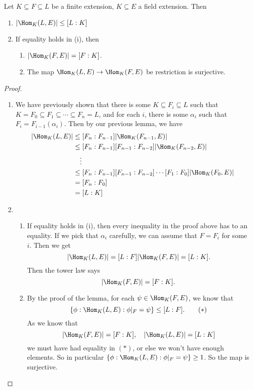 \documentclass[a4paper]{article}
\begin{document}
\begin{thm}[]
  Let $K\subseteq F\subseteq L$ be a finite extension, $K\subseteq E$ a field extension. Then
  \begin{enumerate}
    \item $|\Hom_K(L, E)| \leq [L:K]$
    \item If equality holds in (i), then
      \begin{enumerate}
        \item $|\Hom_K(F, E)| = [F:K]$.
        \item The map $\Hom_K(L, E) \to \Hom_K(F, E)$ be restriction is surjective.
      \end{enumerate}
  \end{enumerate}
\end{thm}

\begin{proof}\leavevmode
  \begin{enumerate}
    \item We have previously shown that there is some $K\subseteq F_i \subseteq L$ such that $K = F_0 \subseteq F_1 \subseteq\cdots \subseteq F_n = L$, and for each $i$, there is some $\alpha_i$ such that $F_i = F_{i - 1}(\alpha_i)$. Then by our previous lemma, we have
      \begin{align*}
        |\Hom_K(L, E)| &\leq [F_n:F_{n - 1}] |\Hom_K(F_{n - 1}, E)|\\
        &\leq [F_n: F_{n - 1}][F_{n - 1}: F_{n - 2}] |\Hom_K(F_{n - 2}, E)|\\
        &\quad \vdots\\
        &\leq [F_n:F_{n - 1}][F_{n - 1}:F_{n - 2}] \cdots [F_1:F_0] |\Hom_K(F_0, E)|\\
        &= [F_n:F_0]\\
        &= [L:K]
      \end{align*}
    \item
    \begin{enumerate}
      \item If equality holds in (i), then every inequality in the proof above has to an equality. If we pick that $\alpha_i$ carefully, we can assume that $F = F_i$ for some $i$. Then we get
        \[
          |\Hom_K(L, E)| = [L:F] |\Hom_K(F, E)| = [L:K].
        \]
        Then the tower law says
        \[
          |\Hom_K(F, E)| = [F:K].
        \]
      \item By the proof of the lemma, for each $\psi \in \Hom_K(F, E)$, we know that
        \[
          \{\phi: \Hom_K(L, E): \phi|_F = \psi\} \leq [L:F].\tag{$*$}
        \]
        As we know that
        \[
          |\Hom_K(F, E)| = [F:K],\quad |\Hom_K(L, E)| = [L:K]
        \]
        we must have had equality in $(*)$, or else we won't have enough elements. So in particular $\{\phi: \Hom_K(L, E): \phi|_F = \psi\} \geq 1$. So the map is surjective.
    \end{enumerate}
  \end{enumerate}
\end{proof}
\end{document}
